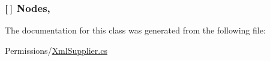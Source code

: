 \subsubsection[{Nodes}]{ \mbox{[}$\,$\mbox{]} Nodes\hspace{0.3cm}{\ttfamily [get]}, {\ttfamily [set]}}\label{classOTA_1_1Permissions_1_1XmlPlayer_ab61d6546169a00b2514bab86c33e487d}


The documentation for this class was generated from the following file\+:\begin{DoxyCompactItemize}
\item 
Permissions/\hyperlink{XmlSupplier_8cs}{Xml\+Supplier.\+cs}\end{DoxyCompactItemize}
